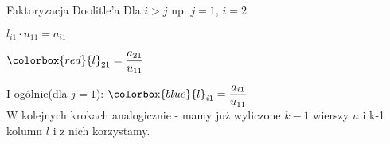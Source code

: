 \begin{frame}{Faktoryzacja Doolitle'a}
Dla $i>j$ np. $j=1$, $i=2$


\vspace{0.5cm}
$l_{i1}\cdot u_{11}=a_{i1}$

$\colorbox{red}{l}_{21}=\displaystyle \frac{a_{21}}{u_{11}}$

I ogólnie(dla $j=1$):
$\colorbox{blue}{l}_{i1}=\displaystyle \frac{a_{i1}}{u_{11}}$\\
W kolejnych  krokach analogicznie -  mamy już wyliczone $k-1$ wierszy $u$ i k-1 kolumn $l$ i z nich korzystamy. 
\end{frame}

